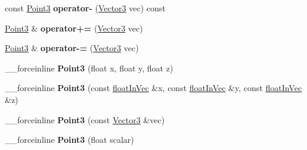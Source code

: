 \begin{DoxyCompactItemize}
\item 
\hypertarget{classVectormath_1_1Aos_1_1Point3_ac6e96a16531b15064f12e78bfa5c32c1}{const \hyperlink{classVectormath_1_1Aos_1_1Point3}{Point3} {\bfseries operator-\/} (\hyperlink{classVectormath_1_1Aos_1_1Vector3}{Vector3} vec) const }\label{classVectormath_1_1Aos_1_1Point3_ac6e96a16531b15064f12e78bfa5c32c1}

\item 
\hypertarget{classVectormath_1_1Aos_1_1Point3_aa6b961770d2cb79a7436315c4db184d0}{\hyperlink{classVectormath_1_1Aos_1_1Point3}{Point3} \& {\bfseries operator+=} (\hyperlink{classVectormath_1_1Aos_1_1Vector3}{Vector3} vec)}\label{classVectormath_1_1Aos_1_1Point3_aa6b961770d2cb79a7436315c4db184d0}

\item 
\hypertarget{classVectormath_1_1Aos_1_1Point3_a26061337361f43dcd667d7f92d0995ac}{\hyperlink{classVectormath_1_1Aos_1_1Point3}{Point3} \& {\bfseries operator-\/=} (\hyperlink{classVectormath_1_1Aos_1_1Vector3}{Vector3} vec)}\label{classVectormath_1_1Aos_1_1Point3_a26061337361f43dcd667d7f92d0995ac}

\item 
\hypertarget{classVectormath_1_1Aos_1_1Point3_afefef06db5576da6ba658e4a5d3447b4}{\-\_\-\-\_\-forceinline {\bfseries Point3} (float x, float y, float z)}\label{classVectormath_1_1Aos_1_1Point3_afefef06db5576da6ba658e4a5d3447b4}

\item 
\hypertarget{classVectormath_1_1Aos_1_1Point3_a430894e700aa969fdbe9d6c4b58b0d0b}{\-\_\-\-\_\-forceinline {\bfseries Point3} (const \hyperlink{classVectormath_1_1floatInVec}{float\-In\-Vec} \&x, const \hyperlink{classVectormath_1_1floatInVec}{float\-In\-Vec} \&y, const \hyperlink{classVectormath_1_1floatInVec}{float\-In\-Vec} \&z)}\label{classVectormath_1_1Aos_1_1Point3_a430894e700aa969fdbe9d6c4b58b0d0b}

\item 
\hypertarget{classVectormath_1_1Aos_1_1Point3_a5489cee3be2045d1a57309afeecb3a3f}{\-\_\-\-\_\-forceinline {\bfseries Point3} (const \hyperlink{classVectormath_1_1Aos_1_1Vector3}{Vector3} \&vec)}\label{classVectormath_1_1Aos_1_1Point3_a5489cee3be2045d1a57309afeecb3a3f}

\item 
\hypertarget{classVectormath_1_1Aos_1_1Point3_ad462a241848fca89c3954860302a7167}{\-\_\-\-\_\-forceinline {\bfseries Point3} (float scalar)}\label{classVectormath_1_1Aos_1_1Point3_ad462a241848fca89c3954860302a7167}


\end{DoxyCompactItemize}

